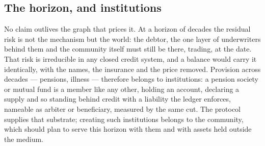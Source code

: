 \subsection{The horizon, and institutions}

No claim outlives the graph that prices it. At a horizon of decades the residual risk is
not the mechanism but the world: the debtor, the one layer of underwriters behind them
and the community itself must still be there, trading, at the date. That risk is
irreducible in any closed credit system, and a balance would carry it identically, with
the names, the insurance and the price removed. Provision across decades --- pensions,
illness --- therefore belongs to institutions: a pension society or mutual fund is a
member like any other, holding an account, declaring a supply and so standing behind
credit with a liability the ledger enforces, nameable as arbiter or beneficiary, measured
by the same cut. The protocol supplies that substrate; creating such institutions belongs
to the community, which should plan to serve this horizon with them and with assets held
outside the medium.
